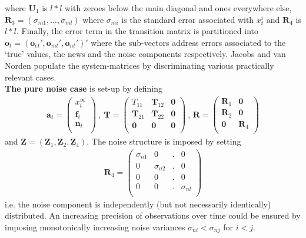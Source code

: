 \documentclass[11pt]{article}
\begin{document}
where $\textbf{U}_1$ is $l*l$ with zeroes below the main diagonal and ones everywhere else, $\textbf{R}_3=(\sigma_{m1},...,\sigma_{ml})$ where $\sigma_{mi}$ is the standard error associated with $x_t^i$ and $\textbf{R}_4$ is $l*l$. Finally, the error term in the transition matrix is partitioned into $\textbf{o}_t=(\textbf{o}_{et}',\textbf{o}_{mt}',\textbf{o}_{nt}')'$ where the sub-vectors address errors associated to the `true' values, the news and the noise components respectively. Jacobs and van Norden populate the system-matrices by discriminating various practically relevant cases. \\

\textbf{The pure noise case} is set-up by defining
\begin{eqnarray*}
\textbf{a}_t=\left(
               \begin{array}{c}
                 x_t^\infty \\
                 \textbf{f}_t \\
                 \textbf{n}_t \\
               \end{array}
             \right)~,~\textbf{T}=\left(
                                    \begin{array}{ccc}
                                      T_{11} & \textbf{T}_{12} & \textbf{0} \\
                                      \textbf{T}_{21} & \textbf{T}_{22} & \textbf{0} \\
                                      \textbf{0} & \textbf{0} & \textbf{0} \\
                                    \end{array}
                                  \right) ~\textrm{,~} \textbf{R}=
\left(
  \begin{array}{cc}
    \textbf{R}_1 & \textbf{0} \\
    \textbf{R}_2 & \textbf{0} \\
    \textbf{0} & \textbf{R}_4 \\
  \end{array}
\right)
\end{eqnarray*}
and $\textbf{Z}=(\textbf{Z}_1,\textbf{Z}_2,\textbf{Z}_4)$. The noise structure is imposed by setting
\begin{eqnarray*}
\textbf{R}_4=\left(
               \begin{array}{cccc}
                 \sigma_{n1} & 0 & . & 0 \\
                 0 & \sigma_{n2} & . & 0 \\
                 0 & 0 & . & 0 \\
                 0 & 0 & . & \sigma_{nl} \\
               \end{array}
             \right)
\end{eqnarray*}
i.e. the noise component is independently (but not necessarily identically) distributed. An increasing precision of observations over time could be ensured by imposing monotonically increasing noise variances $\sigma_{ni}<\sigma_{nj}$ for $i<j$. \\
\end{document}
